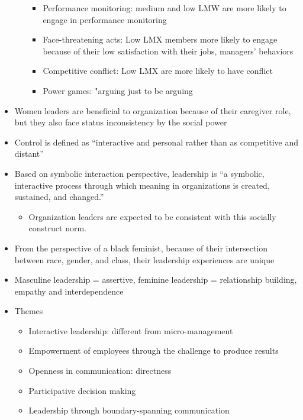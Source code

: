\documentclass[
]{book}
\providecommand{\tightlist}{%
  \setlength{\itemsep}{0pt}\setlength{\parskip}{0pt}}
\begin{document}
\begin{itemize}
\begin{itemize}
    \begin{itemize}
    \item
      Performance monitoring: medium and low LMW are more likely to engage in performance monitoring
    \item
      Face-threatening acts: Low LMX members more likely to engage because of their low satisfaction with their jobs, managers' behaviors
    \item
      Competitive conflict: Low LMX are more likely to have conflict
    \item
      Power games: "arguing just to be arguing
    \end{itemize}
  \end{itemize}
\item
  Women leaders are beneficial to organization because of their caregiver role, but they also face status inconsistency by the social power
\end{itemize}

\citep{Parker_2001}

\begin{itemize}
\item
  Control is defined as ``interactive and personal rather than as competitive and distant''
\item
  Based on symbolic interaction perspective, leadership is ``a symbolic, interactive process through which meaning in organizations is created, sustained, and changed.''

  \begin{itemize}
  \tightlist
  \item
    Organization leaders are expected to be consistent with this socially construct norm.
  \end{itemize}
\item
  From the perspective of a black feminist, because of their intersection between race, gender, and class, their leadership experiences are unique
\item
  Masculine leadership = assertive, feminine leadership = relationship building, empathy and interdependence
\item
  Themes

  \begin{itemize}
  \item
    Interactive leadership: different from micro-management
  \item
    Empowerment of employees through the challenge to produce results
  \item
    Openness in communication: directness
  \item
    Participative decision making
  \item
    Leadership through boundary-spanning communication
  \end{itemize}
\end{itemize}
\end{document}
